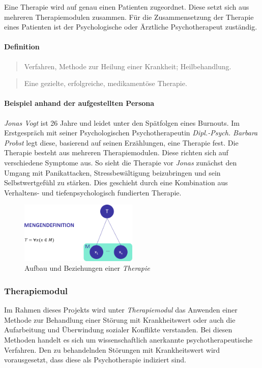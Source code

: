 Eine Therapie wird auf genau  einen Patienten zugeordnet. Diese setzt sich aus mehreren Therapiemodulen zusammen. Für die Zusammensetzung der Therapie eines Patienten ist der Psychologische oder Ärztliche Psychotherapeut zuständig.

\paragraph{Definition}
\begin{quote}
Verfahren, Methode zur Heilung einer Krankheit; Heilbehandlung. \cite{PsychThG4:online}
\end{quote}

\begin{quote}
	Eine gezielte, erfolgreiche, medikamentöse Therapie. \cite{44:online}
\end{quote}

\paragraph{Beispiel anhand der aufgestellten Persona}
\emph{Jonas Vogt} ist 26 Jahre und leidet unter den Spätfolgen eines Burnouts. Im Erstgespräch mit seiner Psychologischen Psychotherapeutin \emph{Dipl.-Psych. Barbara Probst} legt diese, basierend auf seinen Erzählungen, eine Therapie fest. Die Therapie besteht aus  mehreren Therapiemodulen. Diese richten sich auf verschiedene Symptome aus. So sieht die Therapie vor \emph{Jonas} zunächst den Umgang mit Panikattacken, Stressbewältigung beizubringen und sein Selbstwertgefühl zu stärken. Dies geschieht durch eine Kombination aus Verhaltens- und tiefenpsychologisch fundierten Therapie.

\begin{figure}[h]
\centering
\includegraphics[width=0.5\textwidth]{pictures/therapiedef}
\caption{Aufbau und Beziehungen einer \emph{Therapie}}
\label{therapiedef}
\end{figure}


\subsubsection{Therapiemodul}
Im Rahmen dieses Projekts wird unter \emph{Therapiemodul} das Anwenden  einer Methode zur Behandlung einer Störung mit Krankheitswert oder auch die Aufarbeitung und Überwindung sozialer Konflikte verstanden. Bei diesen Methoden handelt es sich um wissenschaftlich anerkannte psychotherapeutische Verfahren. Den zu behandelnden Störungen mit Krankheitswert wird vorausgesetzt, dass diese als Psychotherapie indiziert sind.

